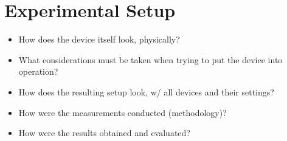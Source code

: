 \chapter{Experimental Setup}
\label{ch:experimentalSetup}

\begin{itemize}\tightlist
    \item
        How does the device itself look, physically?
    \item
        What considerations must  be taken when trying to put  the device into
        operation?
    \item
        How does the resulting setup look, w/ all devices and their settings?
    \item
        How were the measurements conducted (methodology)?
    \item
        How were the results obtained and evaluated?
\end{itemize}
